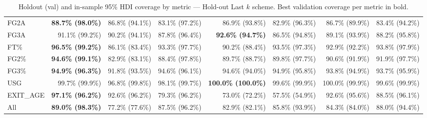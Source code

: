 \documentclass{article}
\begin{document}
\begin{table}[H]
{\begin{tabular}{lrrrrrrr}
FG2A & \textbf{88.7\% (98.0\%)} & 86.8\% (94.1\%) & 83.1\% (97.2\%) & 86.9\% (93.8\%) & 82.9\% (96.3\%) & 86.7\% (89.9\%) & 83.4\% (94.2\%) \\
FG3A & 91.1\% (99.2\%) & 90.2\% (94.1\%) & 87.8\% (96.4\%) & \textbf{92.6\% (94.7\%)} & 86.5\% (94.8\%) & 89.1\% (93.9\%) & 88.2\% (95.8\%) \\
FT\% & \textbf{96.5\% (99.2\%)} & 86.1\% (83.4\%) & 93.3\% (97.7\%) & 90.2\% (88.4\%) & 93.5\% (97.3\%) & 92.9\% (92.2\%) & 93.8\% (97.9\%) \\
FG2\% & \textbf{94.6\% (99.1\%)} & 82.9\% (83.1\%) & 88.4\% (97.8\%) & 89.7\% (88.7\%) & 89.8\% (97.7\%) & 90.6\% (91.9\%) & 91.9\% (97.7\%) \\
FG3\% & \textbf{94.9\% (96.3\%)} & 91.8\% (93.5\%) & 94.6\% (96.1\%) & 94.6\% (94.0\%) & 94.9\% (95.8\%) & 93.8\% (94.9\%) & 93.7\% (95.9\%) \\
USG & 99.7\% (99.9\%) & 96.8\% (99.8\%) & 98.1\% (99.7\%) & \textbf{100.0\% (100.0\%)} & 99.6\% (99.9\%) & 100.0\% (99.9\%) & 99.6\% (99.9\%) \\
EXIT\_AGE & \textbf{97.1\% (96.2\%)} & 92.6\% (96.2\%) & 79.3\% (96.2\%) & 73.0\% (72.2\%) & 57.5\% (54.9\%) & 92.6\% (95.6\%) & 88.5\% (96.1\%) \\
\midrule
All & \textbf{89.0\% (98.3\%)} & 77.2\% (77.6\%) & 87.5\% (96.2\%) & 82.9\% (82.1\%) & 85.8\% (93.9\%) & 84.3\% (84.0\%) & 88.0\% (94.4\%) \\
\bottomrule
\end{tabular}
}
\caption{Holdout (val) and in-sample 95\% HDI coverage by metric --- Hold-out Last $k$ scheme. Best validation coverage per metric in bold.}
\label{tab:hdi_coverage_holdout_last_k}
\end{table}
\end{document}
